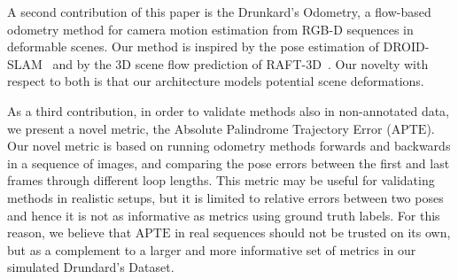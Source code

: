 \documentclass{article}
\begin{document}
A second contribution of this paper is the Drunkard's Odometry, a flow-based odometry method for camera motion estimation from RGB-D sequences in deformable scenes. Our method is inspired by the pose estimation of DROID-SLAM~\cite{teed2021droid} and by the 3D scene flow prediction of RAFT-3D~\cite{teed2021raft}. Our novelty with respect to both is that our architecture models potential scene deformations. 

As a third contribution, in order to validate methods also in non-annotated data, we present a novel metric, the Absolute Palindrome Trajectory Error ($\mathrm{APTE}$). Our novel metric is based on running odometry methods forwards and backwards in a sequence of images, and comparing the pose errors between the first and last frames through different loop lengths. This metric may be useful for validating methods in realistic setups, but it is limited to relative errors between two poses and hence it is not as informative as metrics using ground truth labels. For this reason, we believe that $\mathrm{APTE}$ in real sequences should not be trusted on its own, but as a complement to a larger and more informative set of metrics in our simulated Drundard's Dataset.
\end{document}
